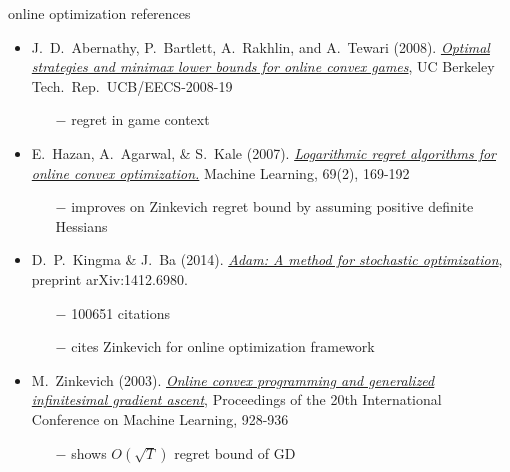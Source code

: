 \documentclass[xcolor={svgnames},
               hyperref={colorlinks,citecolor=DeepPink4,linkcolor=FireBrick,urlcolor=Maroon}]
               {beamer}
\begin{document}
\begin{frame}{online optimization references}

\begin{itemize}
\footnotesize
\item J.~D.~Abernathy, P.~Bartlett, A.~Rakhlin, and A.~Tewari (2008). \href{https://www2.eecs.berkeley.edu/Pubs/TechRpts/2008/EECS-2008-19.pdf}{\emph{Optimal strategies and minimax lower bounds for online convex games}}, UC Berkeley Tech.~Rep.~UCB/EECS-2008-19
    \begin{itemize}
    \scriptsize
    \item[$-$] regret in game context
    \end{itemize}
\item E.~Hazan, A.~Agarwal, \& S.~Kale (2007).  \href{https://link.springer.com/content/pdf/10.1007/s10994-007-5016-8.pdf}{\emph{Logarithmic regret algorithms for online convex optimization.}} Machine Learning, 69(2), 169-192
    \begin{itemize}
    \scriptsize
    \item[$-$] improves on Zinkevich regret bound by assuming positive definite Hessians
    \end{itemize}
\item D.~P.~Kingma \& J.~Ba (2014). \href{https://arxiv.org/abs/1412.6980}{\emph{Adam: A method for stochastic optimization}}, preprint arXiv:1412.6980.
    \begin{itemize}
    \scriptsize
    \item[$-$] 100651 citations
    \item[$-$] cites Zinkevich for online optimization framework
    \end{itemize}
\item M.~Zinkevich (2003). \href{https://www.aaai.org/Papers/ICML/2003/ICML03-120.pdf}{\emph{Online convex programming and generalized infinitesimal gradient ascent}}, Proceedings of the 20th International Conference on Machine Learning, 928-936
    \begin{itemize}
    \scriptsize
    \item[$-$] shows $O(\sqrt{T})$ regret bound of GD
    \end{itemize}
\end{itemize}
\end{frame}
\end{document}
